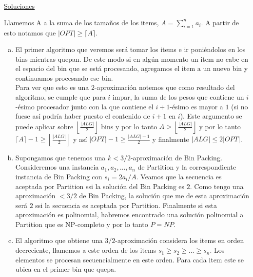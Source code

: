 \documentclass[dcc,uchile]{fcfmcourse}
\theoremstyle{plain}
\theoremstyle{definition}
\begin{document}
\newpage
\begin{center}
{\huge \underline{Soluciones}}
\end{center}
\begin{problems}
\problem Llamemos A a la suma de los tamaños de los items, $A = \sum_{i = 1}^n a_{i}$. A partir de esto notamos que $|OPT| \ge \lceil A \rceil$.
\begin{enumerate}[a)]
\item El primer algoritmo que veremos será tomar los items e ir poniéndolos en los bins mientras quepan. De este modo si en algún momento un item no cabe en el espacio del bin que se está procesando, agregamos el item a un nuevo bin y continuamos procesando ese bin.\\

Para ver que esto es una $2$-aproximación notemos que como resultado del algoritmo, se cumple que para $i$ impar, la suma de los pesos que contiene un $i$-ésimo procesador junto con la que contiene el $i+1$-ésimo es mayor a $1$ (si no fuese así podría haber puesto el contenido de $i+1$ en $i$). Este argumento se puede aplicar sobre $\left\lfloor \frac{|ALG|}{2} \right\rfloor$ bins y por lo tanto $A > \left\lfloor \frac{|ALG|}{2} \right\rfloor$ y por lo tanto $\lceil A\rceil - 1 \ge \left\lfloor \frac{|ALG|}{2} \right\rfloor$ y así $|OPT| - 1 \ge \frac{|ALG|-1}{2}$ y finalmente $|ALG| \le 2|OPT|$.

\item Supongamos que tenemos una $k<3/2$-aproximación de Bin Packing. Consideremos una instancia $a_{1}, a_{2}, \ldots, a_{n}$ de Partition y la correspondiente instancia de Bin Packing con $s_{i} = 2a_{i}/A$. Veamos que la secuencia es aceptada por Partition ssi la solución del Bin Packing es $2$. Como tengo una aproximación $<3/2$ de Bin Packing, la solución que me de esta aproximación será $2$ ssi la secuencia es aceptada por Partition. Finalmente si esta aproximación es polinomial, habremos encontrado una solución polinomial a Partition que es NP-completo y por lo tanto $P = NP$.

\item El algoritmo que obtiene una $3/2$-aproximación considera los items en orden decreciente, llamemos a este orden de los items $s_{1}\ge s_{2} \ge \ldots \ge s_{n}$. Los elementos se procesan secuencialmente en este orden. Para cada item este se ubica en el primer bin que quepa.\\


\end{enumerate}
\end{problems}
\end{document}
